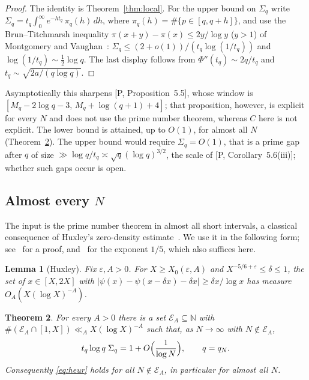 \documentclass[11pt]{article}
\newtheorem{theorem}{Theorem}[section]
\newtheorem{lemma}[theorem]{Lemma}
\theoremstyle{remark}
\begin{document}
\begin{proof}
The identity is Theorem~\ref{thm:local}. For the upper bound on $\Sigma_q$ write
$\Sigma_q=t_q\int_0^\infty e^{-ht_q}\,\pi_q(h)\,dh$, where $\pi_q(h)=\#\{p\in[q,q+h]\}$, and use the
Brun--Titchmarsh inequality $\pi(x+y)-\pi(x)\le2y/\log y$ ($y>1$) of Montgomery and
Vaughan~\cite{MV}: $\Sigma_q\le(2+o(1))/(t_q\log(1/t_q))$ and $\log(1/t_q)\sim\frac12\log q$. The
last display follows from $\Phi''(t_q)\sim2q/t_q$ and $t_q\sim\sqrt{2a/(q\log q)}$.
\end{proof}

Asymptotically this sharpens [P, Proposition~5.5], whose window is
$[M_q-2\log q-3,\,M_q+\log(q+1)+4]$; that proposition, however, is explicit for every $N$ and does
not use the prime number theorem, whereas $C$ here is not explicit. The lower bound is attained,
up to $O(1)$, for almost all $N$ (Theorem~\ref{thm:aa}). The upper bound would require
$\Sigma_q=O(1)$, that is a prime gap after $q$ of size $\gg\log q/t_q\asymp\sqrt q(\log q)^{3/2}$, the
scale of [P, Corollary~5.6(iii)]; whether such gaps occur is open.

\subsection{Almost every \texorpdfstring{$N$}{N}}

The input is the prime number theorem in almost all short intervals, a classical
consequence of Huxley's zero-density estimate~\cite{Hux}. We use it in the following form;
see~\cite[Theorem~7]{Kum} for a proof, and~\cite{Mon} for the exponent $1/5$, which also
suffices here.

\begin{lemma}[Huxley]\label{lem:huxley}
Fix $\varepsilon,A>0$. For $X\ge X_0(\varepsilon,A)$ and $X^{-5/6+\varepsilon}\le\delta\le1$, the
set of $x\in[X,2X]$ with
$|\psi(x)-\psi(x-\delta x)-\delta x|\ge\delta x/\log x$ has measure $O_A(X(\log X)^{-A})$.
\end{lemma}

\begin{theorem}\label{thm:aa}
For every $A>0$ there is a set $\mathcal E_A\subseteq\mathbb N$ with
$\#(\mathcal E_A\cap[1,X])\ll_AX(\log X)^{-A}$ such that, as $N\to\infty$ with
$N\notin\mathcal E_A$,
\[
t_q\log q\;\Sigma_q=1+O\Bigl(\frac1{\log N}\Bigr),\qquad q=q_N .
\]
Consequently \eqref{eq:heur} holds for all $N\notin\mathcal E_A$, in particular for almost
all $N$.
\end{theorem}
\end{document}
